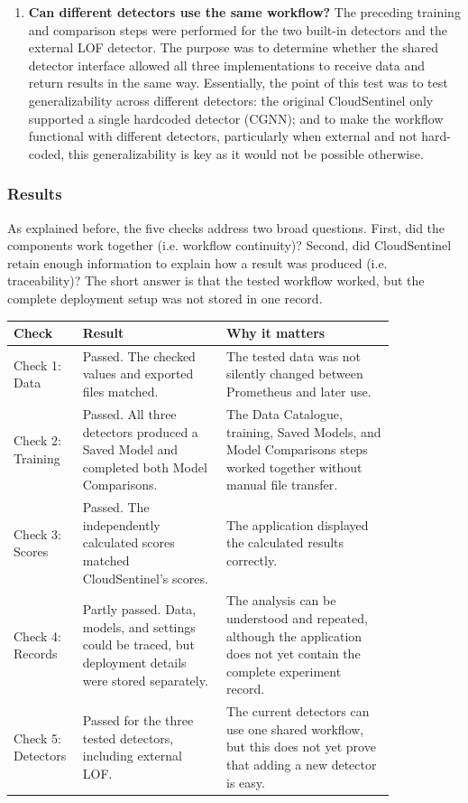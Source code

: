 \begin{enumerate}
    \item[\textbf{Check 5}] \textbf{Can different detectors use the same workflow?}
    The preceding training and comparison steps were performed for the two built-in detectors and the external LOF detector. The purpose was to determine whether the shared detector interface allowed all three implementations to receive data and return results in the same way. Essentially, the point of this test was to test generalizability across different detectors: the original CloudSentinel only supported a single hardcoded detector (CGNN); and to make the workflow functional with different detectors, particularly when external and not hard-coded, this generalizability is key as it would not be possible otherwise.
\end{enumerate}

\subsubsection{Results}

As explained before, the five checks address two broad questions. First, did the components work together (i.e. workflow continuity)? Second, did CloudSentinel retain enough information to explain how a result was produced (i.e. traceability)? The short answer is that the tested workflow worked, but the complete deployment setup was not stored in one record.

\begin{center}
\small
\begin{tabular}{|p{0.10\linewidth}|p{0.34\linewidth}|p{0.40\linewidth}|}
\hline
Check & Result & Why it matters \\
\hline
Check 1: Data & Passed. The checked values and exported files matched. & The tested data was not silently changed between Prometheus and later use. \\
\hline
Check 2: Training & Passed. All three detectors produced a Saved Model and completed both Model Comparisons. & The Data Catalogue, training, Saved Models, and Model Comparisons steps worked together without manual file transfer. \\
\hline
Check 3: Scores & Passed. The independently calculated scores matched CloudSentinel's scores. & The application displayed the calculated results correctly. \\
\hline
Check 4: Records & Partly passed. Data, models, and settings could be traced, but deployment details were stored separately. & The analysis can be understood and repeated, although the application does not yet contain the complete experiment record. \\
\hline
Check 5: Detectors & Passed for the three tested detectors, including external LOF. & The current detectors can use one shared workflow, but this does not yet prove that adding a new detector is easy. \\
\hline
\end{tabular}
\end{center}

